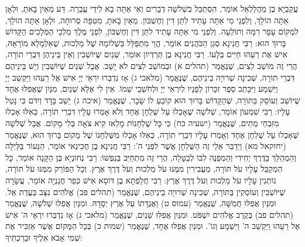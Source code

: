 עֲקַבְיָא בֶן מַהֲלַלְאֵל אוֹמֵר, הִסְתַּכֵּל בִּשְׁלשָׁה דְבָרִים וְאִי אַתָּה בָא לִידֵי עֲבֵרָה. דַּע מֵאַיִן בָּאתָ, וּלְאָן אַתָּה הוֹלֵךְ, וְלִפְנֵי מִי אַתָּה עָתִיד לִתֵּן דִּין וְחֶשְׁבּוֹן. מֵאַיִן בָּאתָ, מִטִּפָּה סְרוּחָה, וּלְאָן אַתָּה הוֹלֵךְ, לִמְקוֹם עָפָר רִמָּה וְתוֹלֵעָה. וְלִפְנֵי מִי אַתָּה עָתִיד לִתֵּן דִּין וְחֶשְׁבּוֹן, לִפְנֵי מֶלֶךְ מַלְכֵי הַמְּלָכִים הַקָּדוֹשׁ בָּרוּךְ הוּא:
רַבִּי חֲנִינָא סְגַן הַכֹּהֲנִים אוֹמֵר, הֱוֵי מִתְפַּלֵּל בִּשְׁלוֹמָהּ שֶׁל מַלְכוּת, שֶׁאִלְמָלֵא מוֹרָאָהּ, אִישׁ אֶת רֵעֵהוּ חַיִּים בְּלָעוֹ. רַבִּי חֲנִינָא בֶן תְּרַדְיוֹן אוֹמֵר, שְׁנַיִם שֶׁיּוֹשְׁבִין וְאֵין בֵּינֵיהֶן דִּבְרֵי תוֹרָה, הֲרֵי זֶה מוֹשַׁב לֵצִים, שֶׁנֶּאֱמַר (תהלים א) וּבְמוֹשַׁב לֵצִים לֹא יָשָׁב. אֲבָל שְׁנַיִם שֶׁיּוֹשְׁבִין וְיֵשׁ בֵּינֵיהֶם דִּבְרֵי תוֹרָה, שְׁכִינָה שְׁרוּיָה בֵינֵיהֶם, שֶׁנֶּאֱמַר (מלאכי ג) אָז נִדְבְּרוּ יִרְאֵי יְיָ אִישׁ אֶל רֵעֵהוּ וַיַּקְשֵׁב יְיָ וַיִּשְׁמָע וַיִּכָּתֵב סֵפֶר זִכָּרוֹן לְפָנָיו לְיִרְאֵי יְיָ וּלְחֹשְׁבֵי שְׁמוֹ. אֵין לִי אֶלָּא שְׁנַיִם, מִנַּיִן שֶׁאֲפִלּוּ אֶחָד שֶׁיּוֹשֵׁב וְעוֹסֵק בַּתּוֹרָה, שֶׁהַקָּדוֹשׁ בָּרוּךְ הוּא קוֹבֵעַ לוֹ שָׂכָר, שֶׁנֶּאֱמַר (איכה ג) יֵשֵׁב בָּדָד וְיִדֹּם כִּי נָטַל עָלָיו:
רַבִּי שִׁמְעוֹן אוֹמֵר, שְׁלשָׁה שֶׁאָכְלוּ עַל שֻׁלְחָן אֶחָד וְלֹא אָמְרוּ עָלָיו דִּבְרֵי תוֹרָה, כְּאִלּוּ אָכְלוּ מִזִּבְחֵי מֵתִים, שֶׁנֶּאֱמַר (ישעיה כח) כִּי כָּל שֻׁלְחָנוֹת מָלְאוּ קִיא צֹאָה בְּלִי מָקוֹם. אֲבָל שְׁלשָׁה שֶׁאָכְלוּ עַל שֻׁלְחָן אֶחָד וְאָמְרוּ עָלָיו דִּבְרֵי תוֹרָה, כְּאִלּוּ אָכְלוּ מִשֻּׁלְחָנוֹ שֶׁל מָקוֹם בָּרוּךְ הוּא, שֶׁנֶּאֱמַר (יחזקאל מא) וַיְדַבֵּר אֵלַי זֶה הַשֻּׁלְחָן אֲשֶׁר לִפְנֵי ה':
רַבִּי חֲנִינָא בֶן חֲכִינַאי אוֹמֵר, הַנֵּעוֹר בַּלַּיְלָה וְהַמְהַלֵּךְ בַּדֶּרֶךְ יְחִידִי וְהַמְפַנֶּה לִבּוֹ לְבַטָּלָה, הֲרֵי זֶה מִתְחַיֵּב בְּנַפְשׁוֹ:
רַבִּי נְחוּנְיָא בֶּן הַקָּנָה אוֹמֵר, כָּל הַמְקַבֵּל עָלָיו עֹל תּוֹרָה, מַעֲבִירִין מִמֶּנּוּ עֹל מַלְכוּת וְעֹל דֶּרֶךְ אֶרֶץ. וְכָל הַפּוֹרֵק מִמֶּנּוּ עֹל תּוֹרָה, נוֹתְנִין עָלָיו עֹל מַלְכוּת וְעֹל דֶּרֶךְ אֶרֶץ:
רַבִּי חֲלַפְתָּא בֶן דּוֹסָא אִישׁ כְּפַר חֲנַנְיָה אוֹמֵר, עֲשָׂרָה שֶׁיּוֹשְׁבִין וְעוֹסְקִין בַּתּוֹרָה, שְׁכִינָה שְׁרוּיָה בֵינֵיהֶם, שֶׁנֶּאֱמַר (תהלים פב) אֱלֹהִים נִצָּב בַּעֲדַת אֵל. וּמִנַּיִן אֲפִלּוּ חֲמִשָּׁה, שֶׁנֶּאֱמַר (עמוס ט) וַאֲגֻדָּתוֹ עַל אֶרֶץ יְסָדָהּ. וּמִנַּיִן אֲפִלּוּ שְׁלשָׁה, שֶׁנֶּאֱמַר (תהלים פב) בְּקֶרֶב אֱלֹהִים יִשְׁפֹּט. וּמִנַּיִן אֲפִלּוּ שְׁנַיִם, שֶׁנֶּאֱמַר (מלאכי ג) אָז נִדְבְּרוּ יִרְאֵי ה' אִישׁ אֶל רֵעֵהוּ וַיַּקְשֵׁב ה' וַיִּשְׁמָע וְגוֹ'. וּמִנַּיִן אֲפִלּוּ אֶחָד, שֶׁנֶּאֱמַר (שמות כ) בְּכָל הַמָּקוֹם אֲשֶׁר אַזְכִּיר אֶת שְׁמִי אָבֹא אֵלֶיךָ וּבֵרַכְתִּיךָ:
